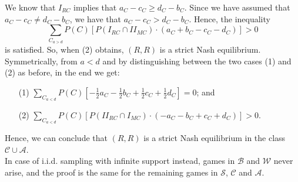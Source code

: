 \documentclass[fleqn,reqno,11pt]{article}
\begin{document}
\noindent We know that $I_{RC}$ implies that $a_{C}-c_{C}\geq d_{C}-b_{C}$.
Since we have assumed that $a_{C}-c_{C}\neq d_{C}-b_{C}$, we have that $a_{C}-c_{C} > d_{C}-b_{C}$. Hence, the inequality 
$$\sum_{C_{a>d}} P(C)[P(I_{RC}\cap II_{MC})\cdot (a_{C} + b_{C} - c_{C} - d_{C})]> 0$$
is satisfied. So, when (2) obtains, $(R,R)$ is a strict Nash equilibrium.
Symmetrically, from $a<d$ and by distinguishing between the two cases (1) and (2) as before, in the end  we get:

\begin{itemize}

\item[(1)] $\sum_{C_{a<d}} P(C)[-\frac{1}{2}a_{C}- \frac{1}{2}b_{C} + \frac{1}{2}c_{C} + \frac{1}{2}d_{C}]= 0$; and

\item[(2)] $\sum_{C_{a<d}} P(C)[P(II_{RC}\cap I_{MC})\cdot (-a_{C} - b_{C} + c_{C} + d_{C})]> 0$.

\end{itemize}


\noindent Hence, we can conclude that $(R,R)$ is a strict Nash equilibrium in the class $\mathcal{C}\cup\mathcal{A}$. \\
In case of i.i.d. sampling with infinite support instead, games in $\mathcal{B} $ and $\mathcal{W} $ never arise, and the proof is the same for the remaining games in $\mathcal{S}$,  $\mathcal{C} $ and $\mathcal{A} $.
\end{document}
